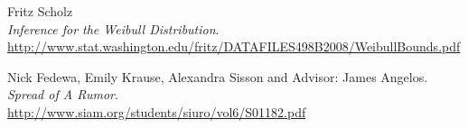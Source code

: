 \begin{thebibliography}{5}
Fritz Scholz\\
\emph{Inference for the Weibull Distribution}.\\
\url{http://www.stat.washington.edu/fritz/DATAFILES498B2008/WeibullBounds.pdf}

Nick Fedewa, Emily Krause, Alexandra Sisson and Advisor: James Angelos.\\
\emph{Spread of A Rumor}.\\
\url{http://www.siam.org/students/siuro/vol6/S01182.pdf}\\


\end{thebibliography}